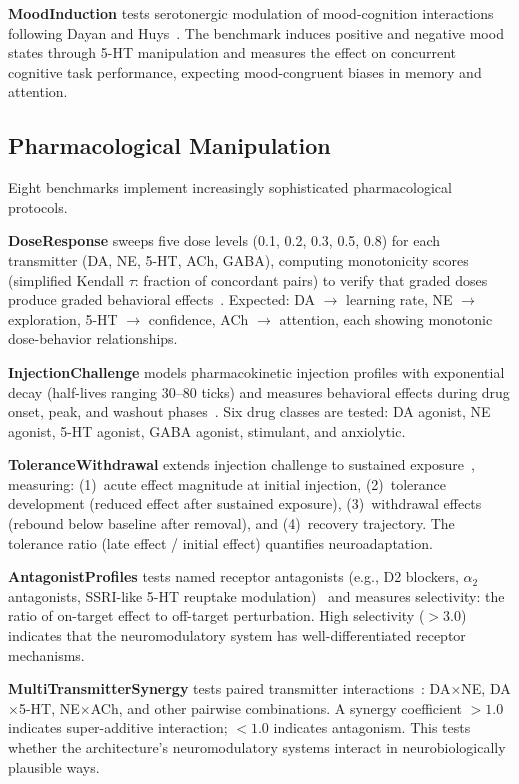 \documentclass[11pt,letterpaper]{article}
\begin{document}
\textbf{MoodInduction} tests serotonergic modulation of mood-cognition interactions following Dayan and Huys~\citep{dayan2009serotonin}. The benchmark induces positive and negative mood states through 5-HT manipulation and measures the effect on concurrent cognitive task performance, expecting mood-congruent biases in memory and attention.

\subsection{Pharmacological Manipulation}

Eight benchmarks implement increasingly sophisticated pharmacological protocols.

\textbf{DoseResponse} sweeps five dose levels (0.1, 0.2, 0.3, 0.5, 0.8) for each transmitter (DA, NE, 5-HT, ACh, GABA), computing monotonicity scores (simplified Kendall $\tau$: fraction of concordant pairs) to verify that graded doses produce graded behavioral effects~\citep{clark1937log}. Expected: DA $\to$ learning rate, NE $\to$ exploration, 5-HT $\to$ confidence, ACh $\to$ attention, each showing monotonic dose-behavior relationships.

\textbf{InjectionChallenge} models pharmacokinetic injection profiles with exponential decay (half-lives ranging 30--80 ticks) and measures behavioral effects during drug onset, peak, and washout phases~\citep{arnsten2011catecholamine}. Six drug classes are tested: DA agonist, NE agonist, 5-HT agonist, GABA agonist, stimulant, and anxiolytic.

\textbf{ToleranceWithdrawal} extends injection challenge to sustained exposure~\citep{koob2001drug}, measuring: (1)~acute effect magnitude at initial injection, (2)~tolerance development (reduced effect after sustained exposure), (3)~withdrawal effects (rebound below baseline after removal), and (4)~recovery trajectory. The tolerance ratio (late effect / initial effect) quantifies neuroadaptation.

\textbf{AntagonistProfiles} tests named receptor antagonists (e.g., D2 blockers, $\alpha_2$ antagonists, SSRI-like 5-HT reuptake modulation)~\citep{stahl2013essential} and measures selectivity: the ratio of on-target effect to off-target perturbation. High selectivity ($> 3.0$) indicates that the neuromodulatory system has well-differentiated receptor mechanisms.

\textbf{MultiTransmitterSynergy} tests paired transmitter interactions~\citep{doya2002metalearning}: DA$\times$NE, DA$\times$5-HT, NE$\times$ACh, and other pairwise combinations. A synergy coefficient $> 1.0$ indicates super-additive interaction; $< 1.0$ indicates antagonism. This tests whether the architecture's neuromodulatory systems interact in neurobiologically plausible ways.
\end{document}
